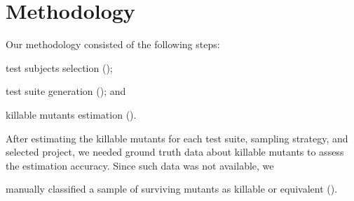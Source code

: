 \documentclass[sigconf]{acmart}
\begin{document}
\section{Methodology}

Our methodology consisted of the following steps:
\begin{enumerate*}[label=(\arabic*)]
    \item test subjects selection ();
    \item test suite generation ();
    and \item killable mutants estimation ().
\end{enumerate*}
After estimating the killable mutants for each test suite, sampling strategy, and selected project,
we needed ground truth data about killable mutants
to assess the estimation accuracy. %
Since such data was not available, %
we 
\begin{enumerate*}[label=(\arabic*),start=4]   
     \item manually classified a sample of surviving mutants as killable or equivalent ().
\end{enumerate*}
\end{document}
